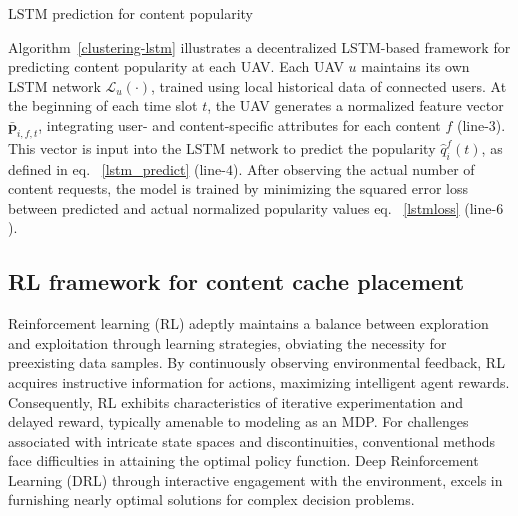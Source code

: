 \documentclass[journal]{IEEEtran}
\begin{document}
\begin{algorithm}
\caption{LSTM prediction for content popularity}
\label{clustering-lstm}




\end{algorithm}

Algorithm~\ref{clustering-lstm} illustrates a decentralized LSTM-based framework for predicting content popularity at each UAV. Each UAV \( u \) maintains its own LSTM network \( \mathcal{L}_u(\cdot) \), trained using local historical data of connected users. At the beginning of each time slot \( t \), the UAV generates a normalized feature vector \( \bar{\textbf{p}}_{i,f,t} \), integrating user- and content-specific attributes for each content \( f \) (line-$3$). This vector is input into the LSTM network to predict the popularity \( \hat{q}^f_i(t) \), as defined in eq. ~\eqref{lstm_predict} (line-$4$). After observing the actual number of content requests, the model is trained by minimizing the squared error loss between predicted and actual normalized popularity values eq. ~\eqref{lstmloss} (line-$6$). 

\subsection{RL framework for content cache placement}

Reinforcement learning (RL) adeptly maintains a balance between exploration and exploitation through learning strategies, obviating the necessity for preexisting data samples. By continuously observing environmental feedback, RL acquires instructive information for actions, maximizing intelligent agent rewards. Consequently, RL exhibits characteristics of iterative experimentation and delayed reward, typically amenable to modeling as an MDP. For challenges associated with intricate state spaces and discontinuities, conventional methods face difficulties in attaining the optimal policy function. Deep Reinforcement Learning (DRL) through interactive engagement with the environment, excels in furnishing nearly optimal solutions for complex decision problems.
\end{document}
